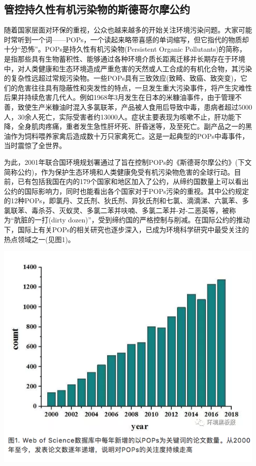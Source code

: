 \documentclass[]{book}
\begin{document}
\hypertarget{ux7ba1ux63a7ux6301ux4e45ux6027ux6709ux673aux6c61ux67d3ux7269ux7684ux65afux5fb7ux54e5ux5c14ux6469ux516cux7ea6}{%
\subsection{管控持久性有机污染物的斯德哥尔摩公约}\label{ux7ba1ux63a7ux6301ux4e45ux6027ux6709ux673aux6c61ux67d3ux7269ux7684ux65afux5fb7ux54e5ux5c14ux6469ux516cux7ea6}}

随着国家层面对环保的重视，公众也越来越多的开始关注环境污染问题。大家可能时常听到一个词------POPs，一个读起来略带喜感的单词缩写，但它指代的物质却十分``恐怖''。POPs是持久性有机污染物(Persistent Organic Pollutants)的简称，是指那些具有生物蓄积性、能够通过各种环境介质长距离迁移并长期存在于环境中，对人类健康和生态环境造成严重危害的天然或人工合成的有机化合物，其污染的复杂性远超过常规污染物。一些POPs具有三致效应(致畸、致癌、致突变)，它们的危害往往具有隐蔽性和突发性的特点，一旦发生重大污染事件，将产生灾难性后果并持续危害几代人。例如1968年3月发生在日本的米糠油事件，由于管理不善，致使生产米糠油时混入多氯联苯，产品被人食用后导致中毒，患病者超过5000人，30余人死亡，实际受害者约13000人。症状主要表现为咳嗽不止，肝功能下降，全身肌肉疼痛，重者发生急性肝坏死、肝昏迷等，及至死亡。副产品之一的黑油作为饲料喂养家禽后造成数十万只家禽死亡。这是一起典型的POPs中毒事件，当时震惊了全世界。

为此，2001年联合国环境规划署通过了旨在控制POPs的《斯德哥尔摩公约》(下文简称公约)，作为保护生态环境和人类健康免受有机污染物危害的全球行动。目前，已有包括我国在内的179个国家和地区加入了公约，从缔约国数量上可以看出公约的国际影响力，同时也能看出各个国家对于POPs污染的重视。其中公约规定的12种POPs，即氯丹、艾氏剂、狄氏剂、异狄氏剂和七氯、滴滴涕、六氯苯、多氯联苯、毒杀芬、灭蚁灵、多氯二苯并呋喃、多氯二苯并-对-二恶英等，被称为``肮脏的一打(dirty dozen)''，受到缔约国的严格控制与削减。在国际公约的推动下，国际上有关POPs的相关研究也逐步深入，已成为环境科学研究中最受关注的热点领域之一(见图1)。

\includegraphics[width=8.33in]{images/gongyue1}
\end{document}
